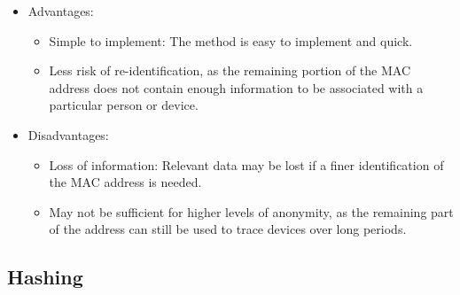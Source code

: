 \documentclass[aps,prb,twocolumn,superscriptaddress,floatfix,longbibliography,nofootinbib]{revtex4-2}
\begin{document}
  \begin{itemize}
    \item Advantages:
      \begin{itemize}
      \item Simple to implement: The method is easy to implement and quick.
      \item Less risk of re-identification, as the remaining portion of the MAC address does not contain enough information to be associated with a particular person or device.
      \end{itemize}
    \item Disadvantages:
      \begin{itemize}
      \item Loss of information: Relevant data may be lost if a finer identification of the MAC address is needed.
      \item May not be sufficient for higher levels of anonymity, as the remaining part of the address can still 
        be used to trace devices over long periods.
      \end{itemize}
  \end{itemize}



  \subsection{\label{subsec:Hashing}Hashing}


\end{document}
